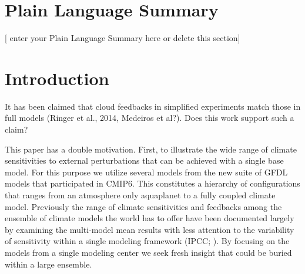 \documentclass[draft]{agujournal2019}
\begin{document}
\section*{Plain Language Summary}
[ enter your Plain Language Summary here or delete this section]


\section{Introduction}


It has been claimed that cloud feedbacks in simplified experiments match those in full models (Ringer et al., 2014, Medeiros et al?).  
Does this work support such a claim? 

This paper has a double motivation.  First, to illustrate the wide range of climate sensitivities to external perturbations 
that can be achieved with a single base model.  For this purpose we utilize several models from the new suite of GFDL 
models that participated in CMIP6.  This constitutes a hierarchy of configurations that ranges from an atmosphere only 
aquaplanet to a fully coupled 
climate model.  Previously the range of climate sensitivities and feedbacks among the ensemble of climate models 
the world has to offer have been documented largely by examining the multi-model mean results with less attention to 
the variability of sensitivity within a single modeling framework (IPCC; ).  By 
focusing on the models from a single modeling center we seek fresh insight that could be buried within a large ensemble.
\end{document}
